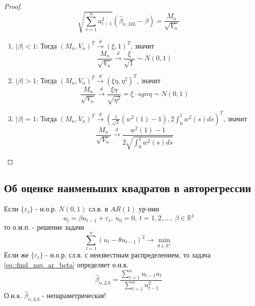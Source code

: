\documentclass[12pt]{article}
\def\eps{ \varepsilon }
\def\R{ \mathbb{R} }
\begin{document}
\begin{proof}
    \[\sqrt{\sum_{t=1}^nu^2_{t-1}}(\widehat{\beta}_{n,ML}-\beta)=\frac{M_n}{\sqrt{V_n}}\]
    \begin{enumerate}
        \item \underline{$\left\lvert \beta\right\rvert <1$}: Тогда $(M_n,V_n)^T\xrightarrow{d}(\xi,1)^T$, значит 
        \[\frac{M_n}{\sqrt{V_n}}\xrightarrow{d}\frac{\xi}{\sqrt{1}}\sim N(0,1)\]
        \item \underline{$\left\lvert \beta\right\rvert >1$}: Тогда $(M_n,V_n)^T\xrightarrow{d}(\xi\eta,\eta^2)^T$, значит 
        \[\frac{M_n}{\sqrt{V_n}}\xrightarrow{d}\frac{\xi\eta}{\sqrt{\eta^2}}=\xi\cdot sgn\eta\sim N(0,1)\]
        \item \underline{$\left\lvert \beta\right\rvert =1$}: Тогда $(M_n,V_n)^T\xrightarrow{d}\left(\frac{1}{\sqrt{2}}(w^2(1)-1),2\int_0^1w^2(s)ds\right)^T$, значит 
        \[\frac{M_n}{\sqrt{V_n}}\xrightarrow{d}\frac{w^2(1)-1}{2\sqrt{\int_0^1w^2(s)ds}}\]
    \end{enumerate}
\end{proof}

\subsection{Об оценке наименьших квадратов в авторегрессии}
Если $\{\eps_t\}$ - н.о.р. $N(0,1)$ сл.в. в $AR(1)$ ур-нии
\begin{equation}
    u_t=\beta u_{t-1}+\eps_t,\ u_0=0,\ t=1,2,\ldots,\ \beta\in\R^1
\end{equation}
то о.м.п. - решение задачи
\begin{equation} \label{eq::find_mp_ar_beta}
    \sum_{t=1}^n(u_t-\theta u_{t-1})^2\rightarrow\min_{\theta\in\R^1}
\end{equation}
Если же $\{\eps_t\}$ - н.о.р. сл.в. с неизвестным распределением, то задача \eqref{eq::find_mp_ar_beta}
определяет о.н.к.
\[\widehat{\beta}_{n,LS}=\frac{\sum_{t=1}^nu_{t-1}u_{t}}{\sum_{t=1}^nu^2_{t-1}}\]
О.н.к. $\widehat{\beta}_{n,LS}$ - непараметрическая!
\end{document}
